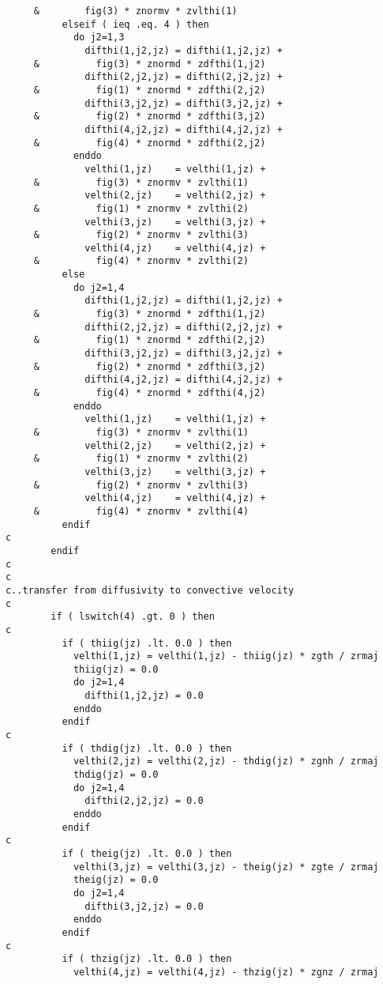\begin{verbatim}
     &        fig(3) * znormv * zvlthi(1)
          elseif ( ieq .eq. 4 ) then
            do j2=1,3
              difthi(1,j2,jz) = difthi(1,j2,jz) +
     &          fig(3) * znormd * zdfthi(1,j2)
              difthi(2,j2,jz) = difthi(2,j2,jz) +
     &          fig(1) * znormd * zdfthi(2,j2)
              difthi(3,j2,jz) = difthi(3,j2,jz) + 
     &          fig(2) * znormd * zdfthi(3,j2)
              difthi(4,j2,jz) = difthi(4,j2,jz) + 
     &          fig(4) * znormd * zdfthi(2,j2)
            enddo
              velthi(1,jz)    = velthi(1,jz) +
     &          fig(3) * znormv * zvlthi(1)
              velthi(2,jz)    = velthi(2,jz) +
     &          fig(1) * znormv * zvlthi(2)
              velthi(3,jz)    = velthi(3,jz) +
     &          fig(2) * znormv * zvlthi(3)
              velthi(4,jz)    = velthi(4,jz) +
     &          fig(4) * znormv * zvlthi(2)
          else
            do j2=1,4
              difthi(1,j2,jz) = difthi(1,j2,jz) +
     &          fig(3) * znormd * zdfthi(1,j2)
              difthi(2,j2,jz) = difthi(2,j2,jz) +
     &          fig(1) * znormd * zdfthi(2,j2)
              difthi(3,j2,jz) = difthi(3,j2,jz) +
     &          fig(2) * znormd * zdfthi(3,j2)
              difthi(4,j2,jz) = difthi(4,j2,jz) +
     &          fig(4) * znormd * zdfthi(4,j2)
            enddo
              velthi(1,jz)    = velthi(1,jz) +
     &          fig(3) * znormv * zvlthi(1)
              velthi(2,jz)    = velthi(2,jz) +
     &          fig(1) * znormv * zvlthi(2)
              velthi(3,jz)    = velthi(3,jz) +
     &          fig(2) * znormv * zvlthi(3)
              velthi(4,jz)    = velthi(4,jz) +
     &          fig(4) * znormv * zvlthi(4)
          endif
c
        endif
c
c
c..transfer from diffusivity to convective velocity
c
        if ( lswitch(4) .gt. 0 ) then
c
          if ( thiig(jz) .lt. 0.0 ) then
            velthi(1,jz) = velthi(1,jz) - thiig(jz) * zgth / zrmaj
            thiig(jz) = 0.0
            do j2=1,4
              difthi(1,j2,jz) = 0.0
            enddo
          endif
c
          if ( thdig(jz) .lt. 0.0 ) then
            velthi(2,jz) = velthi(2,jz) - thdig(jz) * zgnh / zrmaj
            thdig(jz) = 0.0
            do j2=1,4
              difthi(2,j2,jz) = 0.0
            enddo
          endif
c
          if ( theig(jz) .lt. 0.0 ) then
            velthi(3,jz) = velthi(3,jz) - theig(jz) * zgte / zrmaj
            theig(jz) = 0.0
            do j2=1,4
              difthi(3,j2,jz) = 0.0
            enddo
          endif
c
          if ( thzig(jz) .lt. 0.0 ) then
            velthi(4,jz) = velthi(4,jz) - thzig(jz) * zgnz / zrmaj

\end{verbatim}
